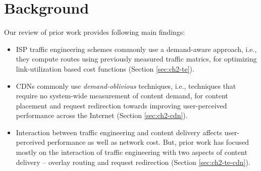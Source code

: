 

\section{Background}
\label{sec:bg-bg}
Our review of prior work provides following main findings:

\begin{itemize}
	\item ISP traffic engineering schemes commonly use a demand-aware approach, i.e., they compute routes using previously measured traffic matrics, for optimizing  link-utilization based cost functions (Section \ref{sec:ch2-te}).	\item CDNs commonly use \emph{demand-oblivious} techniques, i.e., techniques that require no system-wide measurement of content demand, for content placement and request redirection towards improving user-perceived performance across the Internet (Section \ref{sec:ch2-cdn}).
	\item Interaction between traffic engineering and content delivery affects user-perceived performance as well as network cost. But, prior work has focused mostly on the interaction of traffic engineering with two aspects of content delivery --  overlay routing and request redirection (Section \ref{sec:ch2-te-cdn}).
\end{itemize}


